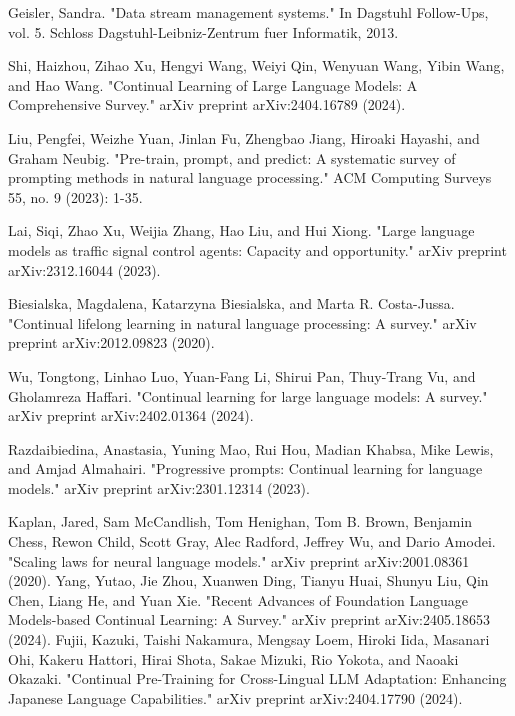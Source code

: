\documentclass[t]{beamer}
\begin{document}
\begin{frame}[allowframebreaks]
\begin{thebibliography}{}
Geisler, Sandra. "Data stream management systems." In Dagstuhl Follow-Ups, vol. 5. Schloss Dagstuhl-Leibniz-Zentrum fuer Informatik, 2013.

Shi, Haizhou, Zihao Xu, Hengyi Wang, Weiyi Qin, Wenyuan Wang, Yibin Wang, and Hao Wang. "Continual Learning of Large Language Models: A Comprehensive Survey." arXiv preprint arXiv:2404.16789 (2024).

Liu, Pengfei, Weizhe Yuan, Jinlan Fu, Zhengbao Jiang, Hiroaki Hayashi, and Graham Neubig. "Pre-train, prompt, and predict: A systematic survey of prompting methods in natural language processing." ACM Computing Surveys 55, no. 9 (2023): 1-35.

Lai, Siqi, Zhao Xu, Weijia Zhang, Hao Liu, and Hui Xiong. "Large language models as traffic signal control agents: Capacity and opportunity." arXiv preprint arXiv:2312.16044 (2023).

Biesialska, Magdalena, Katarzyna Biesialska, and Marta R. Costa-Jussa. "Continual lifelong learning in natural language processing: A survey." arXiv preprint arXiv:2012.09823 (2020).

Wu, Tongtong, Linhao Luo, Yuan-Fang Li, Shirui Pan, Thuy-Trang Vu, and Gholamreza Haffari. "Continual learning for large language models: A survey." arXiv preprint arXiv:2402.01364 (2024).

Razdaibiedina, Anastasia, Yuning Mao, Rui Hou, Madian Khabsa, Mike Lewis, and Amjad Almahairi. "Progressive prompts: Continual learning for language models." arXiv preprint arXiv:2301.12314 (2023).

Kaplan, Jared, Sam McCandlish, Tom Henighan, Tom B. Brown, Benjamin Chess, Rewon Child, Scott Gray, Alec Radford, Jeffrey Wu, and Dario Amodei. "Scaling laws for neural language models." arXiv preprint arXiv:2001.08361 (2020).
Yang, Yutao, Jie Zhou, Xuanwen Ding, Tianyu Huai, Shunyu Liu, Qin Chen, Liang He, and Yuan Xie. "Recent Advances of Foundation Language Models-based Continual Learning: A Survey." arXiv preprint arXiv:2405.18653 (2024).
Fujii, Kazuki, Taishi Nakamura, Mengsay Loem, Hiroki Iida, Masanari Ohi, Kakeru Hattori, Hirai Shota, Sakae Mizuki, Rio Yokota, and Naoaki Okazaki. "Continual Pre-Training for Cross-Lingual LLM Adaptation: Enhancing Japanese Language Capabilities." arXiv preprint arXiv:2404.17790 (2024).

\end{thebibliography}
\end{frame}
\end{document}
